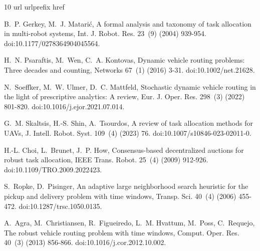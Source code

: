 \documentclass[a4paper,fleqn]{cas-dc}
\begin{document}
\begin{thebibliography}{10}
\expandafter\ifx\csname url\endcsname\relax
  \def\url#1{\texttt{#1}}\fi
\expandafter\ifx\csname urlprefix\endcsname\relax\def\urlprefix{URL }\fi
\expandafter\ifx\csname href\endcsname\relax
  \def\href#1#2{#2} \def\path#1{#1}\fi

B.~P. Gerkey, M.~J. Matari{\'c}, A formal analysis and taxonomy of task
  allocation in multi-robot systems, Int. J. Robot. Res. 23~(9) (2004)
  939-954.
\newblock \href {https://doi.org/10.1177/0278364904045564}
  {\path{doi:10.1177/0278364904045564}}.

H.~N. Psaraftis, M.~Wen, C.~A. Kontovas, Dynamic vehicle routing problems:
  Three decades and counting, Networks 67~(1) (2016) 3-31.
\newblock \href {https://doi.org/10.1002/net.21628}
  {\path{doi:10.1002/net.21628}}.

N.~Soeffker, M.~W. Ulmer, D.~C. Mattfeld, Stochastic dynamic vehicle routing in
  the light of prescriptive analytics: A review, Eur. J. Oper. Res. 298~(3)
  (2022) 801-820.
\newblock \href {https://doi.org/10.1016/j.ejor.2021.07.014}
  {\path{doi:10.1016/j.ejor.2021.07.014}}.

G.~M. Skaltsis, H.-S. Shin, A.~Tsourdos, A review of task allocation methods
  for {UAVs}, J. Intell. Robot. Syst. 109~(4) (2023) 76.
\newblock \href {https://doi.org/10.1007/s10846-023-02011-0}
  {\path{doi:10.1007/s10846-023-02011-0}}.

H.-L. Choi, L.~Brunet, J.~P. How, Consensus-based decentralized auctions for
  robust task allocation, IEEE Trans. Robot. 25~(4) (2009) 912-926.
\newblock \href {https://doi.org/10.1109/TRO.2009.2022423}
  {\path{doi:10.1109/TRO.2009.2022423}}.

S.~Ropke, D.~Pisinger, An adaptive large neighborhood search heuristic for the
  pickup and delivery problem with time windows, Transp. Sci. 40~(4) (2006)
  455-472.
\newblock \href {https://doi.org/10.1287/trsc.1050.0135}
  {\path{doi:10.1287/trsc.1050.0135}}.

A.~Agra, M.~Christiansen, R.~Figueiredo, L.~M. Hvattum, M.~Poss, C.~Requejo,
  The robust vehicle routing problem with time windows, Comput. Oper. Res.
  40~(3) (2013) 856-866.
\newblock \href {https://doi.org/10.1016/j.cor.2012.10.002}
  {\path{doi:10.1016/j.cor.2012.10.002}}.


\end{thebibliography}
\end{document}
